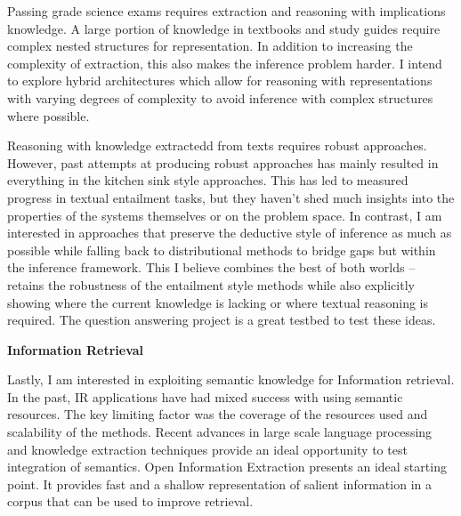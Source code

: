 \documentclass[a4paper,11pt,onecolumn]{article}
\begin{document}
Passing grade science exams requires extraction and reasoning with implications knowledge. A large portion of knowledge in textbooks and study guides require complex nested structures for representation. In addition to increasing the complexity of extraction, this also makes the inference problem harder. I intend to explore hybrid architectures which allow for reasoning with representations with varying degrees of complexity to avoid inference with complex structures where possible. 

Reasoning with knowledge extractedd from texts requires robust approaches. However, past attempts at producing robust approaches has mainly resulted in everything in the kitchen sink style approaches. This has led to measured progress in textual entailment tasks, but they haven't shed much insights into the properties of the systems themselves or on the problem space. In contrast, I am interested in approaches that preserve the deductive style of inference as much as possible while falling back to distributional methods to bridge gaps but within the inference framework. This I believe combines the best of both worlds -- retains the robustness of the entailment style methods while also explicitly showing where the current knowledge is lacking or where textual reasoning is required. The question answering project is a great testbed to test these ideas.

{\bf Information Retrieval}

Lastly, I am interested in exploiting semantic knowledge for Information retrieval. In the past, IR applications have had mixed success with using semantic resources. The key limiting factor was the coverage of the resources used and scalability of the methods. Recent advances in large scale language processing and knowledge extraction techniques provide an ideal opportunity to test integration of semantics. Open Information Extraction presents an ideal starting point. It provides fast and a shallow representation of salient information in a corpus that can be used to improve retrieval. 
\end{document}
